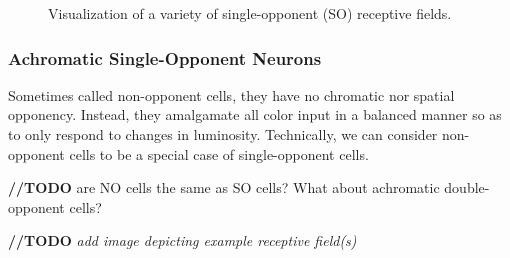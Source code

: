 \documentclass[journal,onecolumn]{IEEEtran}
\begin{document}
\begin{figure}[H]
    \caption{Visualization of a variety of single-opponent (SO) receptive fields.}
    \label{fig:rf-so}
\end{figure}

\subsubsection*{Achromatic Single-Opponent Neurons}

Sometimes called non-opponent cells, they have no chromatic nor spatial opponency. Instead, they amalgamate all color input in a balanced manner so as to only respond to changes in luminosity. Technically, we can consider non-opponent cells to be a special case of single-opponent cells.

\textbf{//TODO} are NO cells the same as SO cells? What about achromatic double-opponent cells?

\textbf{//TODO} \textit{add image depicting example receptive field(s)}
\end{document}
